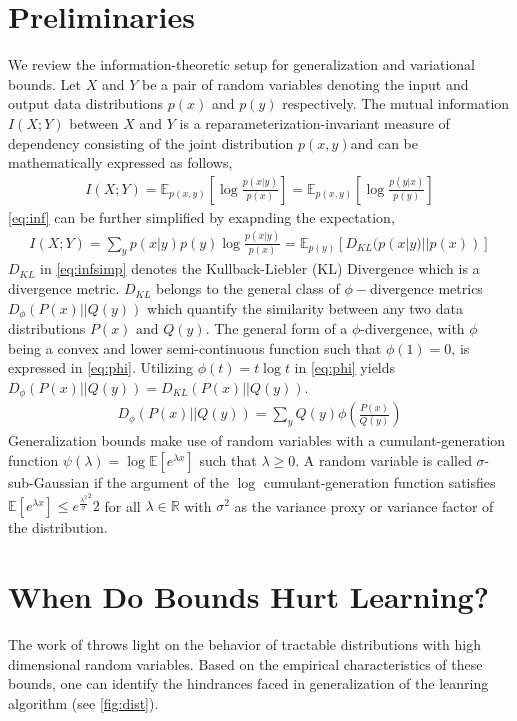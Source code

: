 \documentclass{article}
\begin{document}
\section{Preliminaries}
We review the information-theoretic setup for generalization and variational bounds. Let $X$ and $Y$ be a pair of random variables denoting the input and output data distributions $p(x)$ and $p(y)$ respectively. The mutual information $I(X;Y)$ between $X$ and $Y$ is a reparameterization-invariant measure of dependency consisting of the joint distribution $p(x,y)$and can be mathematically expressed as follows,
\begin{gather}
  I(X;Y) = \mathbb{E}_{p(x,y)}[\log\frac{p(x|y)}{p(x)}] = \mathbb{E}_{p(x,y)}[\log\frac{p(y|x)}{p(y)}] \label{eq:inf}
\end{gather}
\autoref{eq:inf} can be further simplified by exapnding the expectation, 
\begin{gather}
  I(X;Y) = \sum_{y}p(x|y)p(y)\log\frac{p(x|y)}{p(x)} = \mathbb{E}_{p(y)}[D_{KL}(p(x|y)||p(x))] \label{eq:infsimp}
\end{gather}
$D_{KL}$ in \autoref{eq:infsimp} denotes the Kullback-Liebler (KL) Divergence \cite{kl} which is a divergence metric. $D_{KL}$ belongs to the general class of $\phi-$divergence metrics $D_{\phi}(P(x)||Q(y))$ which quantify the similarity between any two data distributions $P(x)$ and $Q(y)$. The general form of a $\phi$-divergence, with $\phi$ being a convex and lower semi-continuous function such that $\phi(1)=0$, is expressed in \autoref{eq:phi}. Utilizing $\phi(t)=t\log t$ in \autoref{eq:phi} yields $D_{\phi}(P(x)||Q(y))=D_{KL}(P(x)||Q(y))$.
\begin{gather}
  D_{\phi}(P(x)||Q(y)) = \sum_{y}Q(y)\phi(\frac{P(x)}{Q(y)}) \label{eq:phi}
\end{gather}   
Generalization bounds make use of random variables with a cumulant-generation \cite{cover} function $\psi(\lambda) = \log\mathbb{E}[e^{\lambda x}]$ such that $\lambda \geq 0$. A random variable is called $\sigma$-sub-Gaussian if the argument of the $\log$ cumulant-generation function satisfies $\mathbb{E}[e^{\lambda x}] \leq e^{\frac{\lambda^{2}}\sigma^{2}}{2}$ for all $\lambda \in \mathbb{R}$ with $\sigma^{2}$ as the variance proxy or variance factor of the distribution.  


\section{When Do Bounds Hurt Learning?}
The work of \cite{variational} throws light on the behavior of tractable distributions with high dimensional random variables. Based on the empirical characteristics of these bounds, one can identify the hindrances faced in generalization of the leanring algorithm (see \autoref{fig:dist}).
\end{document}
